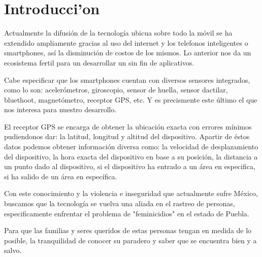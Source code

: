 
\chapter{Introducci'on}

Actualmente la difusión de la tecnología ubicua sobre todo la móvil se ha extendido ampliamente gracias al uso del internet y los telefonos inteligentes o smartphones,  así la disminución de costos de los mismos. Lo anterior nos da un ecosistema fertil para un desarrollar un sin fin de aplicativos.

Cabe especificar que los smartphones cuentan con diversos sensores integrados, como lo son: acelerómetros, giroscopio, sensor de huella, sensor dactilar, bluethoot, magnetómetro, receptor GPS, etc. Y es precismente este último el que nos interesa para nuestro desarrollo.

El receptor GPS se encarga de obtener la ubicación exacta con errores mínimos pudiendonos dar: la latitud, longitud y altitud del dispositivo. Apartir de éstos datos podemos obtener información diversa como: la velocidad de desplazamiento del dispositivo, la hora exacta del dispositivo en base a su posición, la distancia a un punto dado al dispositivo, si el dispositivo ha entrado a un área en especifica, si ha salido de un área en específica. 

Con este conocimiento y la violencia e inseguridad que actualmente sufre México, buscamos que la tecnología se vuelva una aliada en el rastreo de personas, especificamente enfrentar el problema de "feminicidios" en el estado de Puebla. 

Para que las familias y seres queridos de estas personas tengan en medida de lo posible, la tranquilidad de conocer su paradero y saber que se encuentra bien y a salvo.
